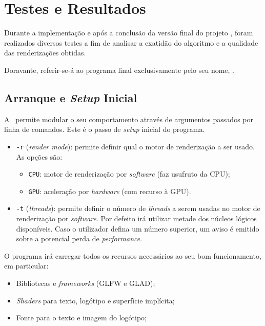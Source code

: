 \chapter{Testes e Resultados}
\label{ch::testes}


Durante a implementação e após a conclusão da versão final do projeto \theapp, foram realizados diversos testes a fim de analisar a exatidão do algoritmo e a qualidade das renderizações obtidas.

Doravante, referir-se-á ao programa final exclusivamente pelo seu nome, \theapp.


\section{Arranque e \textit{Setup} Inicial}
\label{sec::testes::start}

A \theapp~permite modular o seu comportamento através de argumentos passados por linha de comandos. Este é o passo de \textit{setup} inicial do programa.

\begin{itemize}
	\item \verb|-r| (\textit{render mode}): permite definir qual o motor de renderização a ser usado. As opções são:
	\begin{itemize}[nosep]
		\item \verb|CPU|: motor de renderização por \textit{software} (faz usufruto da \ac{CPU});
		\item \verb|GPU|: aceleração por \textit{hardware} (com recurso à \ac{GPU}).
	\end{itemize}
	
	\item \verb|-t| (\textit{threads}): permite definir o número de \textit{threads} a serem usadas no motor de renderização por \textit{software}. Por defeito irá utilizar metade dos núcleos lógicos disponíveis. Caso o utilizador defina um número superior, um aviso é emitido sobre a potencial perda de \textit{performance}.
\end{itemize}

O programa irá carregar todos os recursos necessários ao seu bom funcionamento, em particular:
\begin{itemize}[nosep]
	\item Bibliotecas e \textit{frameworks} (GLFW e \acs{GLAD});
	\item \textit{Shaders} para texto, logótipo e superfície implícita;
	\item Fonte para o texto e imagem do logótipo;
\end{itemize}

